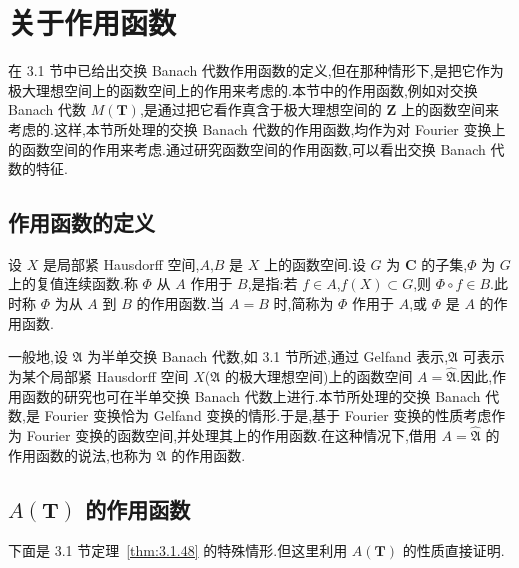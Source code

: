 \section{关于作用函数}\label{sec:3.5}


在 3.1 节中已给出交换 Banach 代数作用函数的定义,但在那种情形下,是把它作为极大理想空间上的函数空间上的作用来考虑的.本节中的作用函数,例如对交换 Banach 代数 $M(\mathbf{T})$,是通过把它看作真含于极大理想空间的 $\mathbf{Z}$ 上的函数空间来考虑的.这样,本节所处理的交换 Banach 代数的作用函数,均作为对 Fourier 变换上的函数空间的作用来考虑.通过研究函数空间的作用函数,可以看出交换 Banach 代数的特征.

\subsection{作用函数的定义}\label{sec:3.5.1}

\begin{definition}\label{def:3.5.1}
设 $X$ 是局部紧 Hausdorff 空间,$A$,$B$ 是 $X$ 上的函数空间.设 $G$ 为 $\mathbf{C}$ 的子集,$\Phi$ 为 $G$ 上的复值连续函数.称 $\Phi$ 从 $A$ 作用于 $B$,是指:若 $f \in A$,$f(X) \subset G$,则 $\Phi \circ f \in B$.此时称 $\Phi$ 为从 $A$ 到 $B$ 的作用函数.当 $A = B$ 时,简称为 $\Phi$ 作用于 $A$,或 $\Phi$ 是 $A$ 的作用函数.
\end{definition}

一般地,设 $\mathfrak{A}$ 为半单交换 Banach 代数,如 3.1 节所述,通过 Gelfand 表示,$\mathfrak{A}$ 可表示为某个局部紧 Hausdorff 空间 $X$($\mathfrak{A}$ 的极大理想空间)上的函数空间 $A = \widehat{\mathfrak{A}}$.因此,作用函数的研究也可在半单交换 Banach 代数上进行.本节所处理的交换 Banach 代数,是 Fourier 变换恰为 Gelfand 变换的情形.于是,基于 Fourier 变换的性质考虑作为 Fourier 变换的函数空间,并处理其上的作用函数.在这种情况下,借用 $A = \widehat{\mathfrak{A}}$ 的作用函数的说法,也称为 $\mathfrak{A}$ 的作用函数.

\subsection{\texorpdfstring{$A(\mathbf{T})$ 的作用函数}{A(T) 的作用函数}}\label{sec:3.5.2}

下面是 3.1 节定理~\ref{thm:3.1.48} 的特殊情形.但这里利用 $A(\mathbf{T})$ 的性质直接证明.

